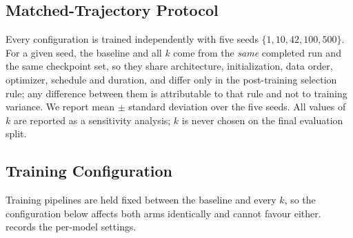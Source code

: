 \subsection{Matched-Trajectory Protocol}

Every configuration is trained independently with five seeds
$\{1,10,42,100,500\}$. For a given seed, the baseline and all $k$ come from the
\emph{same} completed run and the same checkpoint set, so they share
architecture, initialization, data order, optimizer, schedule and duration, and
differ only in the post-training selection rule; any difference between them is
attributable to that rule and not to training variance. We report mean $\pm$
standard deviation over the five seeds. All values of $k$ are reported as a
sensitivity analysis; $k$ is never chosen on the final evaluation split.

\subsection{Training Configuration}

Training pipelines are held fixed between the baseline and every $k$, so the
configuration below affects both arms identically and cannot favour either.
 records the per-model settings.

